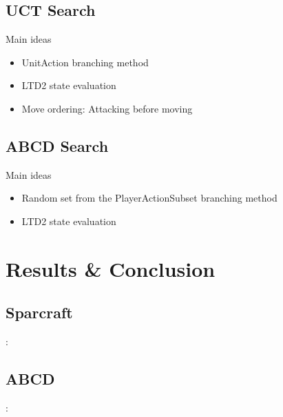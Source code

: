 \documentclass{beamer}
\newenvironment{framesubsec}{
    \begin{frame}{\subsecname}
}{\end{frame}}
\begin{document}
\subsection{UCT Search}
\begin{framesubsec}
    \begin{block}{Main ideas}
        \begin{itemize}
            \item UnitAction branching method 
            \item LTD2 state evaluation
            \item Move ordering: Attacking before moving 
        \end{itemize}
    \end{block}
\end{framesubsec}

\subsection{ABCD Search}
\begin{framesubsec}
    \begin{block}{Main ideas}
        \begin{itemize}
            \item Random set from the PlayerActionSubset branching method 
            \item LTD2 state evaluation
        \end{itemize}
    \end{block}
\end{framesubsec}

\section{Results \& Conclusion}

\subsection{Sparcraft}
\begin{frame}{\secname: \subsecname}
    \begin{center}
\end{center}
\end{frame}

\subsection{ABCD}
\begin{frame}{\secname: \subsecname}
    \begin{center}
\end{center}
\end{frame}
\end{document}
